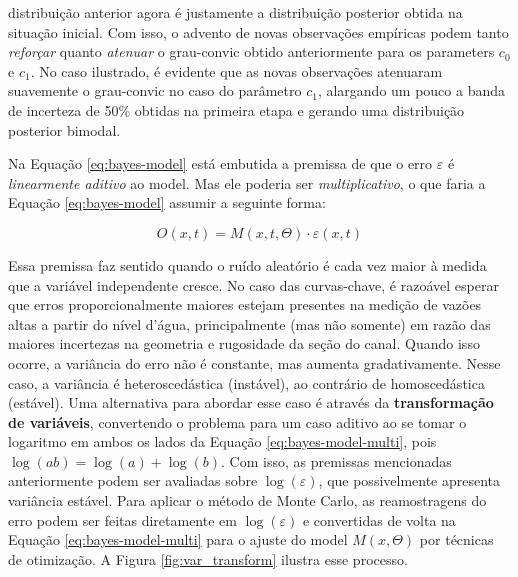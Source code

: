 \documentclass[./main.tex]{subfiles}
\begin{document}
distribuição anterior agora é justamente a distribuição posterior obtida na situação inicial. Com isso, o advento de novas observações empíricas podem tanto \textit{reforçar} quanto \textit{atenuar} o \gls{grau-convic} obtido anteriormente para os \gls{parameters} $c_0$ e $c_1$. No caso ilustrado, é evidente que as novas observações atenuaram suavemente o \gls{grau-convic} no caso do parâmetro $c_1$, alargando um pouco a banda de incerteza de 50\% obtidas na primeira etapa e gerando uma distribuição posterior bimodal. 

\par Na Equação \eqref{eq:bayes-model} está embutida a premissa de que o erro $\varepsilon$ é \textit{linearmente aditivo} ao \gls{model}. Mas ele poderia ser \textit{multiplicativo}, o que faria a Equação \eqref{eq:bayes-model} assumir a seguinte forma:
\begin{linenomath*}
\begin{equation}
\label{eq:bayes-model-multi}
    O(x, t) = M(x, t, \Theta) \cdot \varepsilon(x, t)
\end{equation}
\end{linenomath*}
Essa premissa faz sentido quando o ruído aleatório é cada vez maior à medida que a variável independente cresce. No caso das curvas-chave, é razoável esperar que erros proporcionalmente maiores estejam presentes na medição de vazões altas a partir do nível d'água, principalmente (mas não somente) em razão das maiores incertezas na geometria e rugosidade da seção do canal. Quando isso ocorre, a variância do erro não é constante, mas aumenta gradativamente. Nesse caso, a variância é heteroscedástica (instável), ao contrário de homoscedástica (estável). Uma alternativa para abordar esse caso é através da \textbf{transformação de variáveis}, convertendo o problema para um caso aditivo ao se tomar o logaritmo em ambos os lados da Equação \eqref{eq:bayes-model-multi}, pois $\log(ab) = \log(a) + \log(b)$. Com isso, as premissas  mencionadas anteriormente podem ser avaliadas sobre $\log(\varepsilon)$, que possivelmente apresenta variância estável. Para aplicar o método de Monte Carlo, as reamostragens do erro podem ser feitas diretamente em $\log(\varepsilon)$ e convertidas de volta na Equação \eqref{eq:bayes-model-multi} para o ajuste do \gls{model} $M(x, \Theta)$ por técnicas de otimização. A Figura \ref{fig:var_transform} ilustra esse processo.
\end{document}
